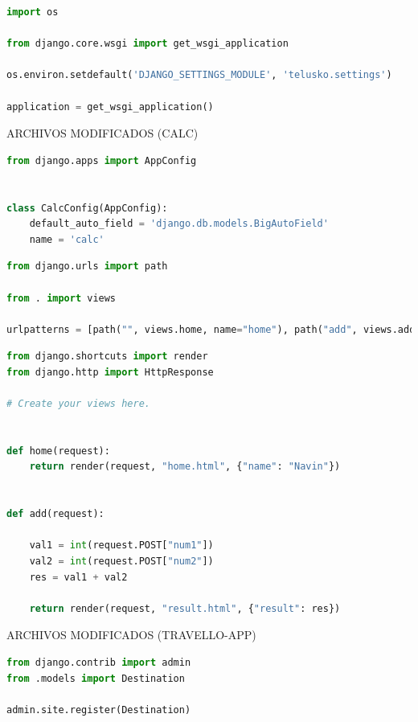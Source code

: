 \documentclass{article}
\begin{document}
        \begin{lstlisting}[language=Python, caption=wsgi.py]
import os

from django.core.wsgi import get_wsgi_application

os.environ.setdefault('DJANGO_SETTINGS_MODULE', 'telusko.settings')

application = get_wsgi_application()

        \end{lstlisting}  
        \item ARCHIVOS MODIFICADOS (CALC)
        \begin{lstlisting}[language=Python, caption=apps.py]
from django.apps import AppConfig


class CalcConfig(AppConfig):
    default_auto_field = 'django.db.models.BigAutoField'
    name = 'calc'

        \end{lstlisting}  
        \begin{lstlisting}[language=Python, caption=urls.py]
from django.urls import path

from . import views

urlpatterns = [path("", views.home, name="home"), path("add", views.add, name="add")]
        \end{lstlisting}  
        \begin{lstlisting}[language=Python, caption=views.py]
from django.shortcuts import render
from django.http import HttpResponse

# Create your views here.


def home(request):
    return render(request, "home.html", {"name": "Navin"})


def add(request):

    val1 = int(request.POST["num1"])
    val2 = int(request.POST["num2"])
    res = val1 + val2

    return render(request, "result.html", {"result": res})

        \end{lstlisting}  
        
        \item ARCHIVOS MODIFICADOS (TRAVELLO-APP)
        
        \begin{lstlisting}[language=Python, caption=admin.py]
from django.contrib import admin
from .models import Destination

admin.site.register(Destination)
        \end{lstlisting} 
\end{document}
